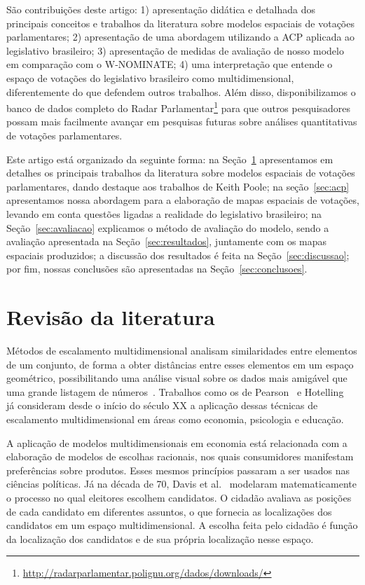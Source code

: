 \documentclass[
	article,			%
	12pt,				%
	oneside,			%
	a4paper,			%
	english,			%
	brazil,				%
	sumario=tradicional,
	oldfontcommands %
	]{abntex2}
\newcommand\wnominate{W-NOMINATE\xspace}
\begin{document}
São contribuições deste artigo: 1) apresentação didática e detalhada dos principais conceitos e trabalhos da literatura sobre modelos espaciais de votações parlamentares; 2) apresentação de uma abordagem utilizando a ACP aplicada ao legislativo brasileiro; 3) apresentação de medidas de avaliação de nosso modelo em comparação com o \wnominate; 4) uma interpretação que entende o espaço de votações do legislativo brasileiro como multidimensional, diferentemente do que defendem outros trabalhos. Além disso, disponibilizamos o banco de dados completo do Radar Parlamentar\footnote{\url{http://radarparlamentar.polignu.org/dados/downloads/}} para que outros pesquisadores possam mais facilmente avançar em pesquisas futuras sobre análises quantitativas de votações parlamentares.

Este artigo está organizado da seguinte forma: na Seção~\ref{sec:revbib} apresentamos em detalhes os principais trabalhos da literatura sobre modelos espaciais de votações parlamentares, dando destaque aos trabalhos de Keith Poole; na seção~\ref{sec:acp} apresentamos nossa abordagem para a elaboração de mapas espaciais de votações, levando em conta questões ligadas a realidade do legislativo brasileiro; na Seção~\ref{sec:avaliacao} explicamos o método de avaliação do modelo, sendo a avaliação apresentada na Seção~\ref{sec:resultados}, juntamente com os mapas espaciais produzidos; a discussão dos resultados é feita na Seção~\ref{sec:discussao}; por fim, nossas conclusões são apresentadas na Seção~\ref{sec:conclusoes}.



\section{Revisão da literatura}
\label{sec:revbib}

Métodos de escalamento multidimensional analisam similaridades entre elementos de um conjunto, de forma a obter distâncias entre esses elementos em um espaço geométrico, possibilitando uma análise visual sobre os dados mais amigável que uma grande listagem de números~\cite{borg2005mds}. Trabalhos como os de Pearson~\cite{pearson1901} e Hotelling~\cite{hotelling1933} já consideram desde o início do século XX a aplicação dessas técnicas de escalamento multidimensional em áreas como economia, psicologia e educação.

A aplicação de modelos multidimensionais em economia está relacionada com a elaboração de modelos de escolhas racionais, nos quais consumidores manifestam preferências sobre produtos. Esses mesmos princípios passaram a ser usados nas ciências políticas. Já na década de 70, Davis et al.~\cite{davis1970electoral} modelaram matematicamente o processo no qual eleitores escolhem candidatos. O cidadão avaliava as posições de cada candidato em diferentes assuntos, o que fornecia as localizações dos candidatos em um espaço multidimensional. A escolha feita pelo cidadão é função da localização dos candidatos e de sua própria localização nesse espaço. 
\end{document}
